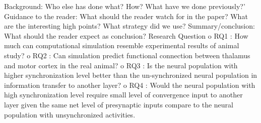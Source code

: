 Background: Who else has done what? How? What have we done previously?’
Guidance to the reader: What should the reader watch for in the paper? What are the interesting high points? What strategy did we use?
Summary/conclusion: What should the reader expect as conclusion?
Research Question
o RQ1 : How much can computational simulation resemble experimental results of animal study?
o RQ2 : Can simulation predict functional connection between thalamus and motor cortex in the real animal?
o	RQ3 : Is the neural population with higher synchronization level better than the un-synchronized neural population in information transfer to another layer? 
o	RQ4 : Would the  neural population with high synchronization level  require small level of convergence input to another layer given the same net level of presynaptic inputs compare to the neural population with unsynchronized activities.

